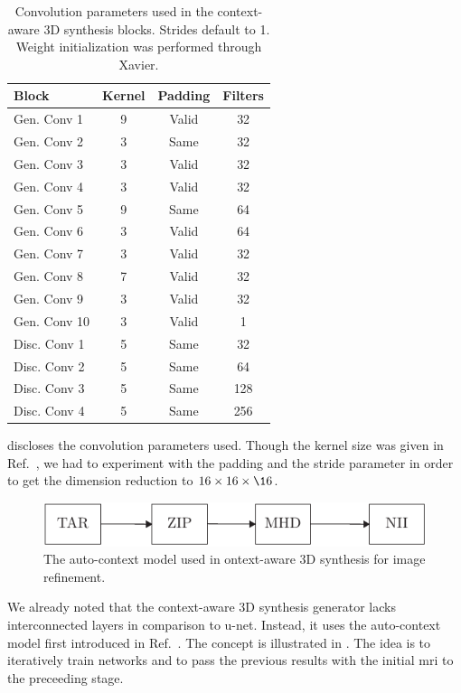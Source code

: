 \begin{table}[h]
  \centering
  \begin{tabular}{lccc}
    \toprule
    Block         & Kernel  & Padding & Filters \\
    \midrule
    Gen. Conv 1   & \num{9} & Valid   & 32      \\
    Gen. Conv 2   & \num{3} & Same    & 32      \\
    Gen. Conv 3   & \num{3} & Valid   & 32      \\
    Gen. Conv 4   & \num{3} & Valid   & 32      \\
    Gen. Conv 5   & \num{9} & Same    & 64      \\
    Gen. Conv 6   & \num{3} & Valid   & 64      \\
    Gen. Conv 7   & \num{3} & Valid   & 32      \\
    Gen. Conv 8   & \num{7} & Valid   & 32      \\
    Gen. Conv 9   & \num{3} & Valid   & 32      \\
    Gen. Conv 10  & \num{3} & Valid   & 1       \\
    Disc. Conv 1  & \num{5} & Same    & 32      \\
    Disc. Conv 2  & \num{5} & Same    & 64      \\
    Disc. Conv 3  & \num{5} & Same    & 128     \\
    Disc. Conv 4  & \num{5} & Same    & 256     \\
    \bottomrule
  \end{tabular}
  \caption{Convolution parameters used in the context-aware 3D synthesis
    blocks. Strides default to \num{1}. Weight initialization was performed
    through Xavier.
  }\label{tab:synthesis:conv}
\end{table}
 discloses the convolution parameters used. Though
the kernel size was given in Ref.~\cite{Nie16}, we had to experiment with
the padding and the stride parameter in order to get the dimension reduction
to $16\times16\times\16$.
\begin{figure}[h]
  \centering
  \includegraphics[page=7,width=\linewidth]{figure/diagrams.pdf}
  \caption{The auto-context model used in ontext-aware 3D synthesis for
    image refinement.
	}\label{fig:synthesis:refine}
\end{figure}
We already noted that the context-aware 3D synthesis generator lacks
interconnected layers in comparison to u-net. Instead, it uses the
auto-context model first introduced in Ref.~\cite{Tu2010}. The concept is
illustrated in . The idea is to iteratively train
networks and to pass the previous results with the initial \gls{mri} to the
preceeding stage.
